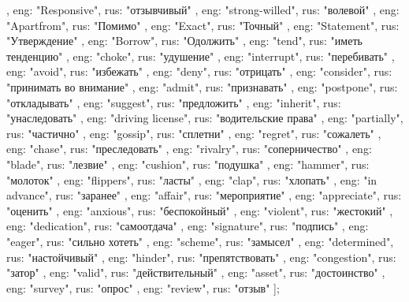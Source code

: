 {}, {
    eng: "Responsive",
    rus: "отзывчивый"
}, {
    eng: "strong-willed",
    rus: "волевой"
}, {
    eng: "Apartfrom",
    rus: "Помимо"
}, {
    eng: "Exact",
    rus: "Точный"
}, {
    eng: "Statement",
    rus: "Утверждение"
}, {
    eng: "Borrow",
    rus: "Одолжить"
}, {
    eng: "tend",
    rus: "иметь тенденцию"
}, {
    eng: "choke",
    rus: "удушение"
}, {
    eng: "interrupt",
    rus: "перебивать"
}, {
    eng: "avoid",
    rus: "избежать"
}, {
    eng: "deny",
    rus: "отрицать"
}, {
    eng: "consider",
    rus: "принимать во внимание"
}, {
    eng: "admit",
    rus: "признавать"
}, {
    eng: "postpone",
    rus: "откладывать"
}, {
    eng: "suggest",
    rus: "предложить"
}, {
    eng: "inherit",
    rus: "унаследовать"
}, {
    eng: "driving license",
    rus: "водительские права"
}, {
    eng: "partially",
    rus: "частично"
}, {
    eng: "gossip",
    rus: "сплетни"
}, {
    eng: "regret",
    rus: "сожалеть"
}, {
    eng: "chase",
    rus: "преследовать"
}, {
    eng: "rivalry",
    rus: "соперничество"
}, {
    eng: "blade",
    rus: "лезвие"
}, {
    eng: "cushion",
    rus: "подушка"
}, {
    eng: "hammer",
    rus: "молоток"
}, {
    eng: "flippers",
    rus: "ласты"
}, {
    eng: "clap",
    rus: "хлопать"
}, {
    eng: "in advance",
    rus: "заранее"
}, {
    eng: "affair",
    rus: "мероприятие"
}, {
    eng: "appreciate",
    rus: "оценить"
}, {
    eng: "anxious",
    rus: "беспокойный"
}, {
    eng: "violent",
    rus: "жестокий"
}, {
    eng: "dedication",
    rus: "самоотдача"
}, {
    eng: "signature",
    rus: "подпись"
}, {
    eng: "eager",
    rus: "сильно хотеть"
}, {
    eng: "scheme",
    rus: "замысел"
}, {
    eng: "determined",
    rus: "настойчивый"
}, {
    eng: "hinder",
    rus: "препятствовать"
}, {
    eng: "congestion",
    rus: "затор"
}, {
    eng: "valid",
    rus: "действительный"
}, {
    eng: "asset",
    rus: "достоинство"
}, {
    eng: "survey",
    rus: "опрос"
}, {
    eng: "review",
    rus: "отзыв"
}];